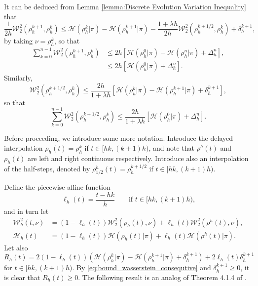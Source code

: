 \documentclass[final,12pt]{colt2018}
\newcommand{\was}{\mathcal{W}}
\begin{document}
It can be deduced from Lemma \ref{lemma:Discrete Evolution Variation Inequality} that
\begin{equation}\label{eq:bound_wasserstein_consequtive}
\frac{1}{2h}\was_2^2(\rho_{h}^{k+1},\rho_{h}^{k}) \leq  \mathcal{H}(\rho_{h}^{k}| \pi) - \mathcal{H}(\rho_{h}^{k+1} | \pi) - \frac{1+\lambda h}{2h}\was_2^2(\rho_{h}^{k+1/2},\rho_{h}^{k}) + \delta_{h}^{k+1},
\end{equation}
by taking $\nu = \rho_{h}^{k}$, so that 
\begin{align}
\sum_{k=0}^{n-1}\was_2^2(\rho_{h}^{k+1},\rho_{h}^{k}) &\leq  2h\left[\mathcal{H}(\rho_{h}^{0} | \pi) - \mathcal{H}(\rho_{h}^{n} | \pi) + \Delta_{h}^{n}\right],\\
& \leq 2h\left[\mathcal{H}(\rho_{h}^{0} | \pi) + \Delta_{h}^{n}\right].
\end{align}
Similarly,
\begin{equation}
\was_2^2(\rho_{h}^{k+1/2},\rho_{h}^{k}) \leq \frac{2h}{1+\lambda h}\left[\mathcal{H}(\rho_{h}^{k}| \pi) - \mathcal{H}(\rho_{h}^{k+1} | \pi) + \delta_{h}^{k+1}\right],
\end{equation}
so that
\begin{equation}\label{eq:bound_wasserstein_consequtive_half}
\sum_{k=0}^{n-1}\was_2^2(\rho_{h}^{k+1/2},\rho_{h}^{k}) \leq \frac{2h}{1+\lambda h}\left[\mathcal{H}(\rho_{h}^{0} | \pi) + \Delta_{h}^{n}\right].
\end{equation}

\vspace{12pt}
Before proceeding, we introduce some more notation. Introduce the delayed interpolation $\rho_{h}(t) = \rho_{h}^{k}$ if $t \in [hk, (k+1)h)$,  and note that $\rho^{h}(t)$ and $\rho_{h}(t)$ are left and right continuous respectively. Introduce also an interpolation of the half-steps, denoted by $\rho^h_{1/2}(t) = \rho_{h}^{k+1/2}$ if $t \in [hk, (k+1)h)$.

Define the piecewise affine function 
\begin{equation} 
\ell_{h}(t) = \frac{t - hk}{h} \qquad \text{if $t \in [hk, (k+1)h)$,}
\end{equation}
and in turn let 
\begin{align}
\was^2_{h}(t, \nu) &= (1- \ell_{h}(t))\was_2^2(\rho_{h}(t), \nu) + \ell_{h}(t)\was_2^2(\rho^{h}(t), \nu), \\
\mathcal{H}_{h}(t) &= (1- \ell_{h}(t))\mathcal{H}(\rho_{h}(t) | \pi) + \ell_{h}(t)\mathcal{H}(\rho^{h}(t) | \pi). 
\end{align}
Let also
\begin{equation}
R_{h}(t) = 2(1- \ell_{h}(t))\left(\mathcal{H}(\rho_{h}^{k} | \pi) - \mathcal{H}(\rho_{h}^{k+1} | \pi) + \delta_{h}^{k+1}\right) + 2\ell_{h}(t) \delta_{h}^{k+1}
\end{equation}
for $t \in [hk, (k+1)h)$. By \eqref{eq:bound_wasserstein_consequtive} and $\delta_{h}^{k+1} \geq 0$, it is clear that $R_{h}(t)\geq 0$. The following result is an analog of Theorem 4.1.4 of \citet{ambrosio2005}.
\end{document}
